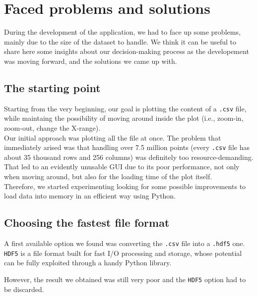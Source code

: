 \documentclass[11pt,a4paper]{article}
\begin{document}
\section{Faced problems and solutions}
\label{sec:faced-problems-and-solutions}

During the development of the application, we had to face up some problems, mainly due to the size of the dataset to handle.
We think it can be useful to share here some insights about our decision-making process as the developement was moving forward, and the solutions we came up with.

\subsection{The starting point}

Starting from the very beginning, our goal is plotting the content of a \texttt{.csv} file, while maintaing the possibility of moving around inside the plot (i.e., zoom-in, zoom-out, change the X-range).\\

Our initial approach was plotting all the file at once. The problem that immediately arised was that handling over 7.5 million points (every \texttt{.csv} file has about 35 thousand rows and 256 columns) was definitely too resource-demanding. That led to an evidently unusable GUI due to its poor performance, not only when moving around, but also for the loading time of the plot itself.\\

Therefore, we started experimenting looking for some possible improvements to load data into memory in an efficient way using Python.\\

\subsection{Choosing the fastest file format}

A first available option we found was converting the \texttt{.csv} file into a \texttt{.hdf5} one. \texttt{HDF5} is a file format built for fast I/O processing and storage, whose potential can be fully exploited through a handy Python library.

However, the result we obtained was still very poor and the \texttt{HDF5} option had to be discarded.\\
\end{document}
